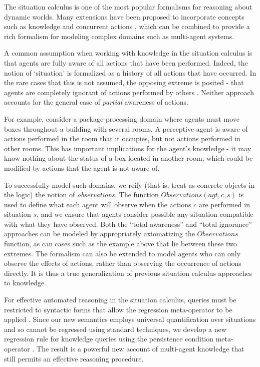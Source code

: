 \documentclass{ifaamas-submission}
\begin{document}
The situation calculus \cite{pirri99contributions_sitcalc} is one
of the most popular formalisms for reasoning about dynamic worlds.
Many extensions have been proposed to incorporate concepts such as
knowledge \cite{scherl03sc_knowledge} and concurrent actions \cite{reiter96sc_nat_conc},
which can be combined to provide a rich formalism for modeling complex
domains such as multi-agent systems.

A common assumption when working with knowledge in the situation calculus
is that agents are fully aware of all actions that have been performed.
Indeed, the notion of `situation' is formalized as a history of all
actions that have occurred. In the rare cases that this is not assumed,
the opposing extreme is posited - that agents are completely ignorant
of actions performed by others \cite{Lesperance99sitcalc_approach}.
Neither approach accounts for the general case of \emph{partial} awareness
of actions. 

For example, consider a package-processing domain where agents must
move boxes throughout a building with several rooms. A perceptive
agent is aware of actions performed in the room that it occupies,
but not actions performed in other rooms. This has important implications
for the agent's knowledge - it may know nothing about the status of
a box located in another room, which could be modified by actions
that the agent is not aware of. 

To successfully model such domains, we reify (that is, treat as concrete
objects in the logic) the notion of \emph{observations.} The function
$Observations(agt,c,s)$ is used to define what each agent will observe
when the actions $c$ are performed in situation $s$, and we ensure
that agents consider possible any situation compatible with what they
have observed. Both the {}``total awareness'' and {}``total ignorance''
approaches can be modeled by appropriately axiomatizing the $Observations$
function, as can cases such as the example above that lie between
these two extremes. The formalism can also be extended to model agents
who can only observe the effects of actions, rather than observing
the occurrence of actions directly. It is thus a true generalization
of previous situation calculus approaches to knowledge.

For effective automated reasoning in the situation calculus, queries
must be restricted to syntactic forms that allow the regression meta-operator
to be applied \cite{pirri99contributions_sitcalc}. Since our new
semantics employs universal quantification over situations and so
cannot be regressed using standard techniques, we develop a new regression
rule for knowledge queries using the persistence condition meta-operator
\cite{kelly07sc_persistence}. The result is a powerful new account
of multi-agent knowledge that still permits an effective reasoning
procedure.
\end{document}
